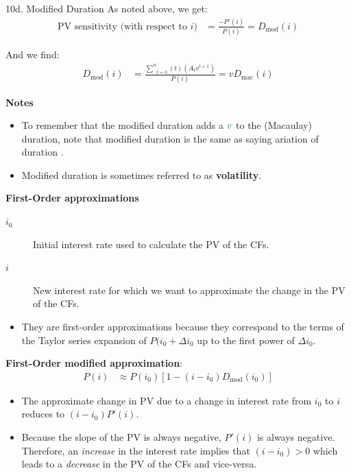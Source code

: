 \begin{CHPT_SUMM_AUTO}[label = {L.-10d}]{10d. Modified Duration}
As noted above, we get:
\begin{align*}
	\text{PV sensitivity (with respect to $i$)}
	&=	\frac{-P'(i)}{P(i)}	
	=	D_{\text{mod}}(i)
\end{align*}

And we find:
\begin{align*}
	D_{\text{mod}}(i)	
	&=	\frac{\underset{t = 0}{\overset{n}{\sum}} (t) (A_{t}v^{t + 1})}{P(i)}	
	=	v D_{\text{mac}}(i)	
\end{align*}

\textbf{Notes}
\begin{itemize}[leftmargin = *]
	\item	To remember that the modified duration adds a ${\color{teal}v}$ to the (Macaulay) duration, note that \og modified duration \fg{} is the same as saying ariation of duration \fg{}.
	\item	Modified duration is sometimes referred to as \textbf{volatility}.
\end{itemize}

\tcbline

\begin{center}
	\textbf{First-Order approximations}
\end{center}

\begin{description}
	\item[$i_{0}$]	Initial interest rate used to calculate the PV of the CFs.
	\item[$i$]	New interest rate for which we want to approximate the change in the PV of the CFs.
\end{description}
\begin{itemize}
	\item	They are \og first-order \fg{} approximations because they correspond to the terms of the Taylor series expansion of $P(i_{0} + \Delta i_{0}$ up to the first power of $\Delta i_{0}$.
\end{itemize}

\textbf{First-Order modified approximation}:
\begin{align*}
	P(i)
	&\approx	P(i_{0})[1 - (i - i_{0})D_{\text{mod}}(i_{0})]
\end{align*}
\begin{itemize}[leftmargin = *]
	\item	The approximate change in PV due to a change in interest rate from $i_{0}$ to $i$ reduces to $(i - i_{0})P'(i)$.
	\item	Because the slope of the PV is always negative, $P'(i)$ is always negative.\\
			Therefore, an {\color{blue}\textit{increase}} in the interest rate implies that $(i - i_{0}) > 0$ which leads to a {\color{red}\textit{decrease}} in the PV of the CFs and vice-versa.
\end{itemize}


\end{CHPT_SUMM_AUTO}
